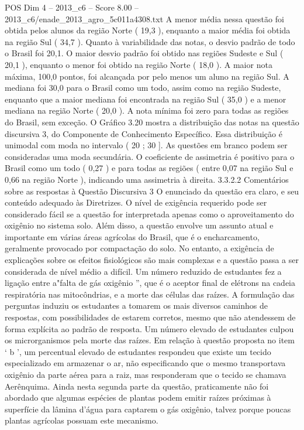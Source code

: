 \begin{textsample}{POS Dim 4 – 2013\_c6 – Score 8.00 – 2013\_c6/enade\_2013\_agro\_5c011a4308.txt}
A menor média nessa questão foi obtida pelos alunos da região Norte ( 19,3 ), enquanto a maior média foi obtida na região Sul ( 34,7 ).
Quanto à variabilidade das notas, o desvio padrão de todo o Brasil foi 20,1.
O maior desvio padrão foi obtido nas regiões Sudeste e Sul ( 20,1 ), enquanto o menor foi obtido na região Norte ( 18,0 ).
A maior nota máxima, 100,0 pontos, foi alcançada por pelo menos um aluno na região Sul.
A mediana foi 30,0 para o Brasil como um todo, assim como na região Sudeste, enquanto que a maior mediana foi encontrada na região Sul ( 35,0 ) e a menor mediana na região Norte ( 20,0 ).
A nota mínima foi zero para todas as regiões do Brasil, sem exceção.
O Gráfico 3.20 mostra a distribuição das notas na questão discursiva 3, do Componente de Conhecimento Específico.
Essa distribuição é unimodal com moda no intervalo ( 20 ; 30 ].
As questões em branco podem ser consideradas uma moda secundária.
O coeficiente de assimetria é positivo para o Brasil como um todo ( 0,27 ) e para todas as regiões ( entre 0,07 na região Sul e 0,66 na região Norte ), indicando uma assimetria à direita. 3.3.2.2 Comentários sobre as respostas à Questão Discursiva 3 O enunciado da questão era claro, e seu conteúdo adequado às Diretrizes.
O nível de exigência requerido pode ser considerado fácil se a questão for interpretada apenas como o aproveitamento do oxigênio no sistema solo.
Além disso, a questão envolve um assunto atual e importante em várias áreas agrícolas do Brasil, que é o encharcamento, geralmente provocado por compactação do solo.
No entanto, a exigência de explicações sobre os efeitos fisiológicos são mais complexas e a questão passa a ser considerada de nível médio a difícil.
Um número reduzido de estudantes fez a ligação entre a"falta de gás oxigênio ”, que é o aceptor final de elétrons na cadeia respiratória nas mitocôndrias, e a morte das células das raízes.
A formulação das perguntas induziu os estudantes a tomarem os mais diversos caminhos de respostas, com possibilidades de estarem corretos, mesmo que não atendessem de forma explícita ao padrão de resposta.
Um número elevado de estudantes culpou os microrganismos pela morte das raízes.
Em relação à questão proposta no item ‘ b ’, um percentual elevado de estudantes respondeu que existe um tecido especializado em armazenar o ar, não especificando que o mesmo transportava oxigênio da parte aérea para a raiz, mas responderam que o tecido se chamava Aerênquima.
Ainda nesta segunda parte da questão, praticamente não foi abordado que algumas espécies de plantas podem emitir raízes próximas à superfície da lâmina d'água para captarem o gás oxigênio, talvez porque poucas plantas agrícolas possuam este mecanismo.

\end{textsample}

